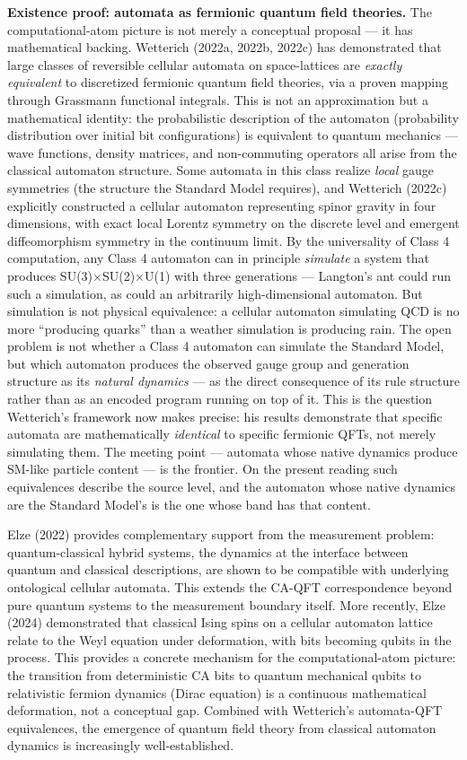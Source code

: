 \documentclass[
]{article}
\begin{document}
\textbf{Existence proof: automata as fermionic quantum field theories.}
The computational-atom picture is not merely a conceptual proposal ---
it has mathematical backing. Wetterich (2022a, 2022b, 2022c) has
demonstrated that large classes of reversible cellular automata on
space-lattices are \emph{exactly equivalent} to discretized fermionic
quantum field theories, via a proven mapping through Grassmann
functional integrals. This is not an approximation but a mathematical
identity: the probabilistic description of the automaton (probability
distribution over initial bit configurations) is equivalent to quantum
mechanics --- wave functions, density matrices, and non-commuting
operators all arise from the classical automaton structure. Some
automata in this class realize \emph{local} gauge symmetries (the
structure the Standard Model requires), and Wetterich (2022c) explicitly
constructed a cellular automaton representing spinor gravity in four
dimensions, with exact local Lorentz symmetry on the discrete level and
emergent diffeomorphism symmetry in the continuum limit. By the
universality of Class 4 computation, any Class 4 automaton can in
principle \emph{simulate} a system that produces SU(3)×SU(2)×U(1) with
three generations --- Langton's ant could run such a simulation, as
could an arbitrarily high-dimensional automaton. But simulation is not
physical equivalence: a cellular automaton simulating QCD is no more
``producing quarks'' than a weather simulation is producing rain. The
open problem is not whether a Class 4 automaton can simulate the
Standard Model, but which automaton produces the observed gauge group
and generation structure as its \emph{natural dynamics} --- as the
direct consequence of its rule structure rather than as an encoded
program running on top of it. This is the question Wetterich's framework
now makes precise: his results demonstrate that specific automata are
mathematically \emph{identical} to specific fermionic QFTs, not merely
simulating them. The meeting point --- automata whose native dynamics
produce SM-like particle content --- is the frontier. On the present
reading such equivalences describe the source level, and the automaton
whose native dynamics are the Standard Model's is the one whose band has
that content.

Elze (2022) provides complementary support from the measurement problem:
quantum-classical hybrid systems, the dynamics at the interface between
quantum and classical descriptions, are shown to be compatible with
underlying ontological cellular automata. This extends the CA-QFT
correspondence beyond pure quantum systems to the measurement boundary
itself. More recently, Elze (2024) demonstrated that classical Ising
spins on a cellular automaton lattice relate to the Weyl equation under
deformation, with bits becoming qubits in the process. This provides a
concrete mechanism for the computational-atom picture: the transition
from deterministic CA bits to quantum mechanical qubits to relativistic
fermion dynamics (Dirac equation) is a continuous mathematical
deformation, not a conceptual gap. Combined with Wetterich's
automata-QFT equivalences, the emergence of quantum field theory from
classical automaton dynamics is increasingly well-established.
\end{document}

